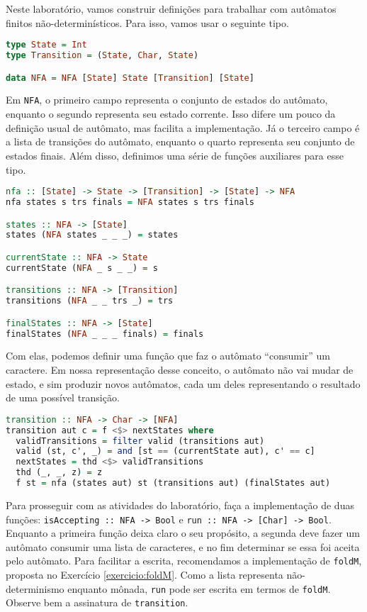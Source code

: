 \documentclass[a4paper]{article}
\begin{document}
Neste laboratório, vamos construir definições para trabalhar com autômatos finitos
não-determinísticos.
Para isso, vamos usar o seguinte tipo.

\begin{lstlisting}[language=haskell, frame=single]
type State = Int
type Transition = (State, Char, State)

data NFA = NFA [State] State [Transition] [State]
\end{lstlisting}

Em \texttt{NFA}, o primeiro campo representa o conjunto de estados do autômato,
enquanto o segundo representa seu estado corrente.
Isso difere um pouco da definição usual de autômato, mas facilita a
implementação.
Já o terceiro campo é a lista de transições do autômato, enquanto o quarto
representa seu conjunto de estados finais.
Além disso, definimos uma série de funções auxiliares para esse tipo.

\pagebreak

\begin{lstlisting}[language=haskell, frame=single]
nfa :: [State] -> State -> [Transition] -> [State] -> NFA
nfa states s trs finals = NFA states s trs finals

states :: NFA -> [State]
states (NFA states _ _ _) = states

currentState :: NFA -> State
currentState (NFA _ s _ _) = s

transitions :: NFA -> [Transition]
transitions (NFA _ _ trs _) = trs

finalStates :: NFA -> [State]
finalStates (NFA _ _ _ finals) = finals
\end{lstlisting}

Com elas, podemos definir uma função que faz o autômato ``consumir'' um
caractere.
Em nossa representação desse conceito, o autômato não vai mudar de estado, e sim
produzir novos autômatos, cada um deles representando o resultado de uma
possível transição.

\begin{lstlisting}[language=haskell, frame=single]
transition :: NFA -> Char -> [NFA]
transition aut c = f <$> nextStates where
  validTransitions = filter valid (transitions aut)
  valid (st, c', _) = and [st == (currentState aut), c' == c]
  nextStates = thd <$> validTransitions
  thd (_, _, z) = z
  f st = nfa (states aut) st (transitions aut) (finalStates aut)
\end{lstlisting}

Para prosseguir com as atividades do laboratório, faça a implementação de duas
funções: \mbox{\texttt{isAccepting :: NFA -> Bool}} e \texttt{run :: NFA -> [Char] -> Bool}.
Enquanto a primeira função deixa claro o seu propósito, a segunda deve fazer um
autômato consumir uma lista de caracteres, e no fim determinar se essa foi
aceita pelo autômato.
Para facilitar a escrita, recomendamos a implementação de \texttt{foldM},
proposta no Exercício \ref{exercicio:foldM}.
Como a lista representa não-determinismo enquanto mônada, \texttt{run} pode ser
escrita em termos de \texttt{foldM}.
Observe bem a assinatura de \texttt{transition}.
\end{document}
